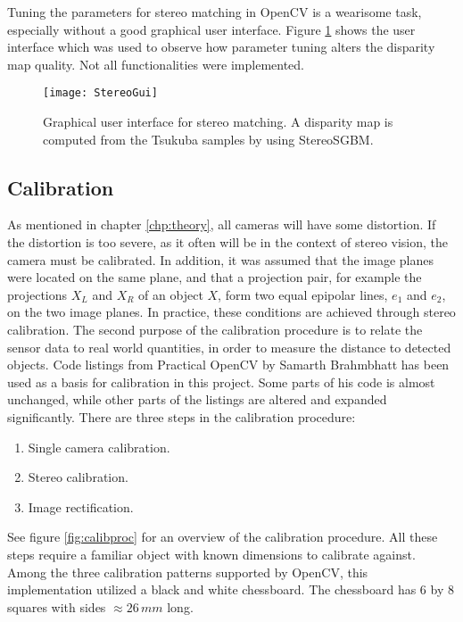 Tuning the parameters for stereo matching in OpenCV is a wearisome task, especially without a good graphical user interface. Figure \ref{fig:StereoGui} shows the user interface which was used to observe how parameter tuning alters the disparity map quality. Not all functionalities were implemented.

\begin{figure}
	\texttt{[image: StereoGui]}
	\caption{Graphical user interface for stereo matching. A disparity map is computed from the Tsukuba samples by using StereoSGBM. }
	\label{fig:StereoGui}
\end{figure}

\subsection{Calibration}

As mentioned in chapter \ref{chp:theory}, all cameras will have some distortion. If the distortion is too severe, as it often will be in the context of stereo vision, the camera must be calibrated. In addition, it was assumed that the image planes were located on the same plane, and that a projection pair, for example the projections $X_L$ and $X_R$ of an object $X$, form two equal epipolar lines, $e_1$ and $e_2$, on the two image planes. In practice, these conditions are achieved through stereo calibration. The second purpose of the calibration procedure is to relate the sensor data to real world quantities, in order to measure the distance to detected objects. Code listings from Practical OpenCV by Samarth Brahmbhatt \cite{practicalopencv} has been used as a basis for calibration in this project. Some parts of his code is almost unchanged, while other parts of the listings are altered and expanded significantly. There are three steps in the calibration procedure:

\begin{enumerate}
	\item Single camera calibration.
	\item Stereo calibration.
	\item Image rectification.
\end{enumerate}

See figure \ref{fig:calibproc} for an overview of the calibration procedure. All these steps require a familiar object with known dimensions to calibrate against. Among the three calibration patterns supported by OpenCV, this implementation utilized a black and white chessboard. The chessboard has 6 by 8 squares with sides $\approx 26 \, mm$ long.

